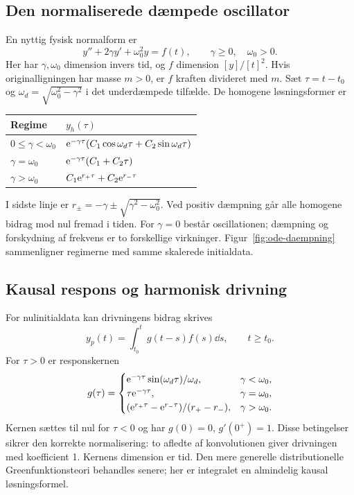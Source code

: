 \subsection{Den normaliserede dæmpede oscillator}
En nyttig fysisk normalform er
\begin{equation}
 y''+2\gamma y'+\omega_0^2y=f(t),\qquad
 \gamma\ge0,\quad\omega_0>0.
 \label{eq:ode-oscillator}
\end{equation}
Her har $\gamma,\omega_0$ dimension invers tid, og $f$ dimension
$[y]/[t]^2$. Hvis originalligningen har masse $m>0$, er $f$ kraften
divideret med $m$. Sæt $\tau=t-t_0$ og
$\omega_d=\sqrt{\omega_0^2-\gamma^2}$ i det underdæmpede tilfælde.
De homogene løsningsformer er
\begin{center}
\begin{tabular}{@{}ll@{}}
\toprule
Regime & $y_h(\tau)$\\
\midrule
$0\le\gamma<\omega_0$ & $\mathrm{e}^{-\gamma\tau}(C_1\cos\omega_d\tau+C_2\sin\omega_d\tau)$\\[2mm]
$\gamma=\omega_0$ & $\mathrm{e}^{-\gamma\tau}(C_1+C_2\tau)$\\[2mm]
$\gamma>\omega_0$ & $C_1\mathrm{e}^{r_+\tau}+C_2\mathrm{e}^{r_-\tau}$\\
\bottomrule
\end{tabular}
\end{center}
I sidste linje er $r_\pm=-\gamma\pm\sqrt{\gamma^2-\omega_0^2}$.
Ved positiv dæmpning går alle homogene bidrag mod nul fremad i tiden.
For $\gamma=0$ består oscillationen; dæmpning og forskydning af frekvens
er to forskellige virkninger. Figur~\ref{fig:ode-daempning} sammenligner
regimerne med samme skalerede initialdata.



\subsection{Kausal respons og harmonisk drivning}
For nulinitialdata kan drivningens bidrag skrives
\[
 y_p(t)=\int_{t_0}^{t}g(t-s)f(s)\dd s,\qquad t\ge t_0.
\]
For $\tau>0$ er responskernen
\[
 g(\tau)=
 \begin{cases}
 \mathrm{e}^{-\gamma\tau}\sin(\omega_d\tau)/\omega_d,
     &\gamma<\omega_0,\\
 \tau\mathrm{e}^{-\gamma\tau},&\gamma=\omega_0,\\
 (\mathrm{e}^{r_+\tau}-\mathrm{e}^{r_-\tau})/(r_+-r_-),&\gamma>\omega_0.
 \end{cases}
\]
Kernen sættes til nul for $\tau<0$ og har $g(0)=0$, $g'(0^+)=1$.
Disse betingelser sikrer den korrekte normalisering: to afledte af
konvolutionen giver drivningen med koefficient 1. Kernens dimension er
tid. Den mere generelle distributionelle Greenfunktionsteori behandles
senere; her er integralet en almindelig kausal løsningsformel.

